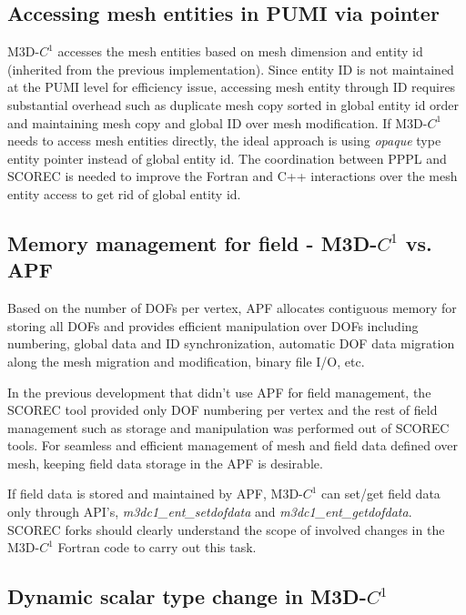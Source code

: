 \documentclass[11pt]{article}  %
\begin{document}
\subsection{Accessing mesh entities in PUMI via pointer}
M3D-$C^1$ accesses the mesh entities based on mesh dimension and entity id (inherited from the previous implementation). Since entity ID is not maintained at the PUMI level for efficiency issue, accessing mesh entity through ID requires substantial overhead such as duplicate mesh copy sorted in global entity id order and maintaining mesh copy and global ID over mesh modification. If M3D-$C^1$ needs to access mesh entities directly, the ideal approach is using \emph{opaque} type entity pointer instead of global entity id. The coordination between PPPL and SCOREC is needed to improve the Fortran and C++ interactions over the mesh entity access to get rid of global entity id.

\subsection{Memory management for field - M3D-$C^1$ vs. APF}

Based on the number of DOFs per vertex, APF allocates contiguous memory for storing all DOFs and provides efficient manipulation over DOFs including numbering, global data and ID synchronization, automatic DOF data migration along the mesh migration and modification, binary file I/O, etc. 

In the previous development that didn't use APF for field management, the SCOREC tool provided only DOF numbering per vertex and the rest of field management such as storage and manipulation was performed out of SCOREC tools. For seamless and efficient management of mesh and field data defined over mesh, keeping field data storage in the APF is desirable. 

If field data is stored and maintained by APF, M3D-$C^1$ can set/get field data only through API's, \emph{m3dc1\_ent\_setdofdata} and \emph{m3dc1\_ent\_getdofdata}. SCOREC forks should clearly understand the scope of involved changes in the M3D-$C^1$ Fortran code to carry out this task.

\subsection{Dynamic scalar type change in M3D-$C^1$}
\end{document}
